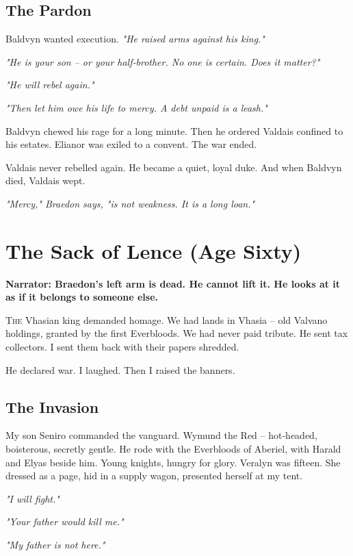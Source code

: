 \documentclass[11pt]{book}
\begin{document}
\section*{The Pardon}
Baldvyn wanted execution. \emph{"He raised arms against his king."}

\emph{"He is your son -- or your half‑brother. No one is certain. Does it matter?"}

\emph{"He will rebel again."}

\emph{"Then let him owe his life to mercy. A debt unpaid is a leash."}

Baldvyn chewed his rage for a long minute. Then he ordered Valdais confined to his estates. Elianor was exiled to a convent. The war ended.

Valdais never rebelled again. He became a quiet, loyal duke. And when Baldvyn died, Valdais wept.

\vspace{1em}
\noindent\textit{"Mercy," Braedon says, "is not weakness. It is a long loan."}

\clearpage

\chapter{The Sack of Lence (Age Sixty)}

\textbf{Narrator: Braedon's left arm is dead. He cannot lift it. He looks at it as if it belongs to someone else.}

\lettrine{T}{he} Vhasian king demanded homage. We had lands in Vhasia -- old Valvano holdings, granted by the first Everbloods. We had never paid tribute. He sent tax collectors. I sent them back with their papers shredded.

He declared war. I laughed. Then I raised the banners.

\section*{The Invasion}
My son Seniro commanded the vanguard. Wymund the Red -- hot‑headed, boisterous, secretly gentle. He rode with the Everbloods of Aberiel, with Harald and Elyas beside him. Young knights, hungry for glory. Veralyn was fifteen. She dressed as a page, hid in a supply wagon, presented herself at my tent.

\emph{"I will fight."}

\emph{"Your father would kill me."}

\emph{"My father is not here."}
\end{document}
